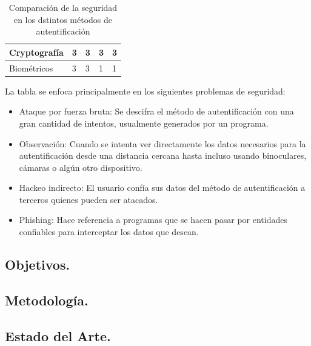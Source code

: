 \documentclass[12pt, a4paper, titlepage]{article}
\begin{document}
\begin{table}[htb]
{\begin{tabular}{l|l|l|l|l|}
						\multicolumn{1}{|l|}{Cryptografía}                                                     & 3                                                                 & 3           & 3                                                          & 3        \\ \hline
						\multicolumn{1}{|l|}{Biométricos}                                                      & 3                                                                 & 3           & 1                                                          & 1        \\ \hline
					\end{tabular}
				}
			\caption{Comparación de la seguridad en los dstintos métodos de autentificación}
			\end{table}
		La tabla se enfoca principalmente en los siguientes problemas de seguridad: 
		
		\begin{itemize}
			\item Ataque por fuerza bruta: Se descifra el método de autentificación con una gran cantidad de intentos, usualmente generados por un programa.
			\item Observación: Cuando se intenta ver directamente los datos necesarios para la autentificación desde una distancia cercana hasta incluso usando binoculares, cámaras o algún otro dispositivo.
			\item Hackeo indirecto: El usuario confía sus datos del método de autentificación a terceros quienes pueden ser atacados. 
			\item Phishing: Hace referencia a programas que se hacen pasar por entidades confiables para interceptar los datos que desean.
		\end{itemize}
			
	\newpage
		\subsection{Objetivos.}
		\subsection{Metodología.}
		\subsection{Estado del Arte.}
	\newpage
\end{document}
